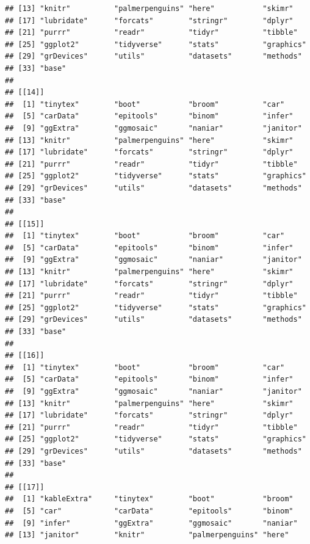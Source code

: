 \documentclass[
]{book}
\begin{document}
\begin{verbatim}
## [13] "knitr"          "palmerpenguins" "here"           "skimr"         
## [17] "lubridate"      "forcats"        "stringr"        "dplyr"         
## [21] "purrr"          "readr"          "tidyr"          "tibble"        
## [25] "ggplot2"        "tidyverse"      "stats"          "graphics"      
## [29] "grDevices"      "utils"          "datasets"       "methods"       
## [33] "base"          
## 
## [[14]]
##  [1] "tinytex"        "boot"           "broom"          "car"           
##  [5] "carData"        "epitools"       "binom"          "infer"         
##  [9] "ggExtra"        "ggmosaic"       "naniar"         "janitor"       
## [13] "knitr"          "palmerpenguins" "here"           "skimr"         
## [17] "lubridate"      "forcats"        "stringr"        "dplyr"         
## [21] "purrr"          "readr"          "tidyr"          "tibble"        
## [25] "ggplot2"        "tidyverse"      "stats"          "graphics"      
## [29] "grDevices"      "utils"          "datasets"       "methods"       
## [33] "base"          
## 
## [[15]]
##  [1] "tinytex"        "boot"           "broom"          "car"           
##  [5] "carData"        "epitools"       "binom"          "infer"         
##  [9] "ggExtra"        "ggmosaic"       "naniar"         "janitor"       
## [13] "knitr"          "palmerpenguins" "here"           "skimr"         
## [17] "lubridate"      "forcats"        "stringr"        "dplyr"         
## [21] "purrr"          "readr"          "tidyr"          "tibble"        
## [25] "ggplot2"        "tidyverse"      "stats"          "graphics"      
## [29] "grDevices"      "utils"          "datasets"       "methods"       
## [33] "base"          
## 
## [[16]]
##  [1] "tinytex"        "boot"           "broom"          "car"           
##  [5] "carData"        "epitools"       "binom"          "infer"         
##  [9] "ggExtra"        "ggmosaic"       "naniar"         "janitor"       
## [13] "knitr"          "palmerpenguins" "here"           "skimr"         
## [17] "lubridate"      "forcats"        "stringr"        "dplyr"         
## [21] "purrr"          "readr"          "tidyr"          "tibble"        
## [25] "ggplot2"        "tidyverse"      "stats"          "graphics"      
## [29] "grDevices"      "utils"          "datasets"       "methods"       
## [33] "base"          
## 
## [[17]]
##  [1] "kableExtra"     "tinytex"        "boot"           "broom"         
##  [5] "car"            "carData"        "epitools"       "binom"         
##  [9] "infer"          "ggExtra"        "ggmosaic"       "naniar"        
## [13] "janitor"        "knitr"          "palmerpenguins" "here"          

\end{verbatim}
\end{document}
